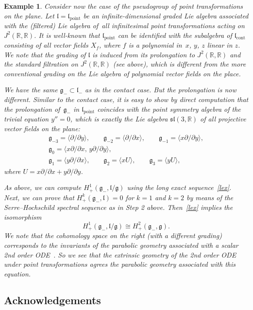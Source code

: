 \documentclass[pdftex]{sigma}%
\newcommand{\R}{\mathbb R}
\newcommand{\g}{\mathfrak g}
\newcommand{\lf}{\mathfrak l}
\newtheorem{ex}[thm]{Example}
\numberwithin{equation}{section}
\begin{document}
\begin{ex}
	Consider now the case of the pseudogroup of point transformations on the plane. Let $\lf=\lf_{\textrm{point}}$ be an infinite-dimensional graded Lie algebra associated with the (filtered) Lie algebra of~all infinitesimal point transformations acting on $J^2(\R,\R)$. It is well-known that $\lf_{\textrm{point}}$ can be identified with the subalgebra of $\lf_{\textrm{cont}}$ consisting of all vector fields $X_f$, where $f$ is a polynomial in~$x$, $y$, $z$ linear in $z$. We note that the grading of $\lf$ is induced from its prolongation to $J^2(\R,\R)$ and the standard filtration on $J^2(\R,\R)$ (see above), which is different from the more conventional grading on the Lie algebra of polynomial vector fields on the place.
	
	We have the same $\g_{-}\subset \lf_{-}$ as in the contact case. But the prolongation is now different. Similar to the contact case, it is easy to show by direct computation that the prolongation of~$\g_{-}$ in $\lf_{\textrm{point}}$ coincides with the point symmetry algebra of the trivial equation $y''=0$, which is exactly the Lie algebra $\mathfrak{sl}(3,\R)$ of all projective vector fields on the plane:
	\begin{gather*}
	\g_{-3} = \langle \partial/\partial y \rangle,\qquad
	\g_{-2} = \langle \partial/\partial x \rangle, \qquad
	\g_{-1} = \langle x\partial/\partial y \rangle, \\
	\g_{0} = \langle x\partial/\partial x, \, y\partial/\partial y\rangle,\\
	\g_{1} = \langle y\partial/\partial x \rangle, \qquad
	\g_{2} = \langle x U \rangle, \qquad
	\g_{3} = \langle y U \rangle,
	\end{gather*}
	where $U= x\partial/\partial x+y\partial/\partial y$.
	
	As above, we can compute $H_{+}^1(\g_{-},\lf/\g)$ using the long exact sequence~\eqref{lex}. Next, we can prove that $H^k_{+}(\g_{-},\lf)=0$ for $k=1$ and $k=2$ by means of the Serre--Hochschild spectral sequence as in Step 2 above. Then~\eqref{lex} implies the isomorphism
	\[
	H^1_{+}(\g_{-}, \lf/\g) \cong H^2_{+}(\g_{-},\g).
	\]
	We note that the cohomology space on the right (with a different grading) corresponds to the invariants of the parabolic geometry associated with a scalar 2nd order ODE~\cite{capslovak,tan79}. So we see that the extrinsic geometry of the 2nd order ODE under point transformations agrees the parabolic geometry associated with this equation.
\end{ex}

\subsection*{Acknowledgements}
\end{document}
